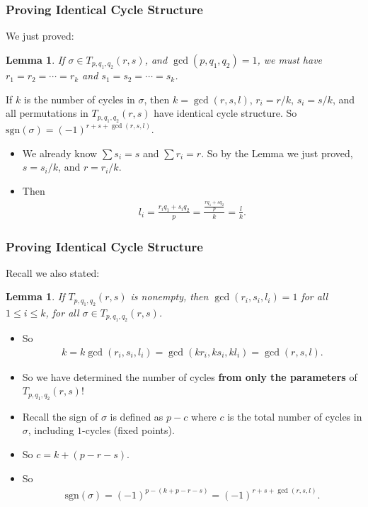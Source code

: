 \documentclass{beamer}
\theoremstyle{plain}
\newtheorem{lem}[theorem]{Lemma}
\theoremstyle{definition}
\theoremstyle{remark}
\newcommand{\bee}{\begin{equation}\begin{aligned}}
\newcommand{\eee}{\end{aligned}\end{equation}}
\newcommand{\fracc}{\frac}				%
\renewcommand{\leq}{\leqslant}			%
\renewcommand{\'}{\hspace{0.5mm}'}		%
\begin{document}

\begin{frame}
\frametitle{Proving Identical Cycle Structure}

	We just proved:
	\begin{lem}
		If $\sigma \in T_{p,q_1,q_2}(r,s)$, 
		and 
		$\gcd(p,q_1,q_2) = 1$, we must have
		$r_1 = r_2 = \cdots = r_k$ and 
		$s_1 = s_2 = \cdots = s_k$. 
	\end{lem}
	
	\begin{theorem}
		If $k$ is the number of cycles in $\sigma$, then
		$k = \gcd(r,s,l)$, $r_i = r/k$, $s_i = s/k$, and
		all permutations in $T_{p,q_1,q_2}(r,s)$ have identical
		cycle structure. 
		So $\mathrm{sgn}(\sigma) = (-1)^{r + s + \gcd(r,s,l)}$. 
	\end{theorem}
	
	\begin{itemize}
		\item We already know $\sum s_i = s$ and $\sum r_i = r$. 
		So by the Lemma we just proved, $s = s_i/k$, and 
		$r = r_i/k$. 
		\item Then
		\bee
			l_i = \fracc{r_iq_1 + s_iq_2}{p} = 
			\fracc{\fracc{rq_1 + sq_2}{p}}{k} = \fracc{l}{k}. 
		\eee
	\end{itemize}

\end{frame}






\begin{frame}
\frametitle{Proving Identical Cycle Structure}

	Recall we also stated:
	\begin{lem}
		If $T_{p,q_1,q_2}(r,s)$ is nonempty, 
		then $\gcd(r_i,s_i,l_i) = 1$
		for all $1 \leq i \leq k$, for all
		$\sigma \in T_{p,q_1,q_2}(r,s)$. 
	\end{lem}

	
	\begin{itemize}
		\item So 
		\bee
			k = k\gcd(r_i,s_i,l_i) = \gcd(kr_i,ks_i,kl_i) 
			= \gcd(r,s,l). 
		\eee
		\item So we have determined the number of cycles
		\textbf{from only the parameters} of $T_{p,q_1,q_2}(r,s)$!
		\item Recall the sign of $\sigma$ is defined as 
		$p - c$ where $c$ 
		is the total number of cycles 
		in $\sigma$, including $1$-cycles (fixed points). 
		\item So $c = k + (p - r - s)$. 
		\item So 
		\bee
			\mathrm{sgn}(\sigma) = (-1)^{p - (k + p - r - s)}
			= (-1)^{r + s + \gcd(r,s,l)}. 
		\eee
	\end{itemize}

\end{frame}
\end{document}
